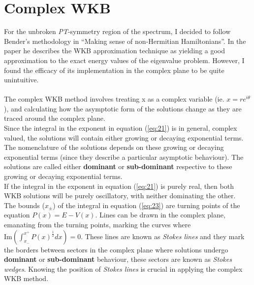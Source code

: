 \documentclass[10pt, a4paper, singlespacing, headsepline]{report}
\newcommand\PT{\emph{PT}}
\begin{document}
\section{Complex WKB}\label{Complex WKB}
For the unbroken \PT-symmetry region of the spectrum, I decided to follow Bender's methodology in ``Making sense of non-Hermitian Hamiltonians''. In the paper he describes the WKB approximation technique as yielding a good approximation to the exact energy values of the eigenvalue problem. However, I found the efficacy of its implementation in the complex plane to be quite unintuitive.\\\\
The complex WKB method involves treating x as a complex variable (ie. $x = re^{i\theta}$), and calculating how the asymptotic form of the solutions change as they are traced around the complex plane\cite{Sorrell}.\\
Since the integral in the exponent in equation (\ref{eq:21}) is in general, complex valued, the solutions will contain either growing or decaying exponential terms. The nomenclature of the solutions depends on these growing or decaying exponential terms (since they describe a particular asymptotic behaviour). The solutions are called either \textbf{dominant} or \textbf{sub-dominant} respective to these growing or decaying exponential terms. \\If the integral in the exponent in equation (\ref{eq:21}) is purely real, then both WKB solutions will be purely oscillatory, with neither dominating the other\cite{Sorrell}.\\
The bounds ($x_{\pm}$) of the integral in equation (\ref{eq:23}) are turning points of the equation $P(x) = E - V(x)$. Lines can be drawn in the complex plane, emanating from the turning points, marking the curves where $\mathrm{Im}(\int_{x_-}^{x^+} P(x)^{\frac{1}{2}}dx) = 0$. These lines are known as \emph{Stokes lines} and they mark the borders between sectors in the complex plane where solutions undergo \textbf{dominant} or \textbf{sub-dominant} behaviour, these sectors are known as \emph{Stokes wedges}. Knowing the position of \emph{Stokes lines} is crucial in applying the complex WKB method\cite{Sorrell}.
\end{document}
